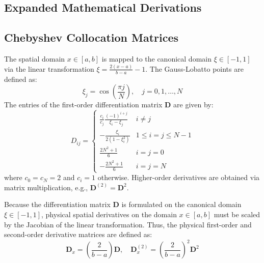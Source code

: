 \documentclass[11pt,a4paper]{article}
\theoremstyle{definition}
\numberwithin{equation}{section}
\begin{document}
\begin{appendices}

\section{Expanded Mathematical Derivations}
\label{app:math}

\subsection{Chebyshev Collocation Matrices}
The spatial domain $x \in [a, b]$ is mapped to the canonical domain $\xi \in [-1, 1]$ via the linear transformation $\xi = \frac{2(x-a)}{b-a} - 1$. The Gauss-Lobatto points are defined as:
\begin{equation}
    \xi_j = \cos\left(\frac{\pi j}{N}\right), \quad j = 0, 1, \dots, N
\end{equation}
The entries of the first-order differentiation matrix $\mathbf{D}$ are given by:
\begin{equation}
    D_{ij} = \begin{cases} 
        \frac{c_i}{c_j} \frac{(-1)^{i+j}}{\xi_i - \xi_j} & i \neq j \\
        -\frac{\xi_i}{2(1-\xi_i^2)} & 1 \leq i = j \leq N-1 \\
        \frac{2N^2+1}{6} & i = j = 0 \\
        -\frac{2N^2+1}{6} & i = j = N
    \end{cases}
\end{equation}
where $c_0 = c_N = 2$ and $c_i = 1$ otherwise. Higher-order derivatives are obtained via matrix multiplication, e.g., $\mathbf{D}^{(2)} = \mathbf{D}^2$.

Because the differentiation matrix $\mathbf{D}$ is formulated on the canonical domain $\xi \in [-1, 1]$, physical spatial derivatives on the domain $x \in [a, b]$ must be scaled by the Jacobian of the linear transformation. Thus, the physical first-order and second-order derivative matrices are defined as:
\begin{equation}
    \mathbf{D}_x = \left(\frac{2}{b-a}\right) \mathbf{D}, \quad \mathbf{D}_x^{(2)} = \left(\frac{2}{b-a}\right)^2 \mathbf{D}^2
\end{equation}


\end{appendices}
\end{document}
